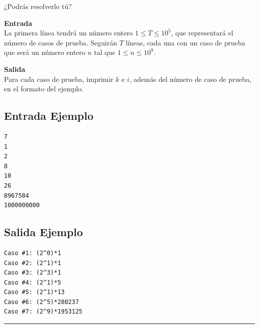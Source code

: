 ¿Podrás resolverlo tú?

\textbf{Entrada}\\
La primera línea tendrá un número entero $1\leq T\leq 10^5$, que representará el número de casos de prueba.
Seguirán $T$ líneas, cada una con un caso de prueba que será un número entero $n$ tal que $1 \leq n \leq 10^9$.

\textbf{Salida}\\
Para cada caso de prueba, imprimir $k$ e $i$, además del número de caso de prueba, en el formato del ejemplo.
\begin{multicols}{2}
\subsection*{Entrada Ejemplo}
\begin{verbatim}
7
1
2
8
10
26
8967584
1000000000
\end{verbatim}

\subsection*{Salida Ejemplo}
\begin{verbatim}
Caso #1: (2^0)*1
Caso #2: (2^1)*1
Caso #3: (2^3)*1
Caso #4: (2^1)*5
Caso #5: (2^1)*13
Caso #6: (2^5)*280237
Caso #7: (2^9)*1953125
\end{verbatim}
\end{multicols}
\noindent \rule[0.5ex]{1\columnwidth}{1pt}
